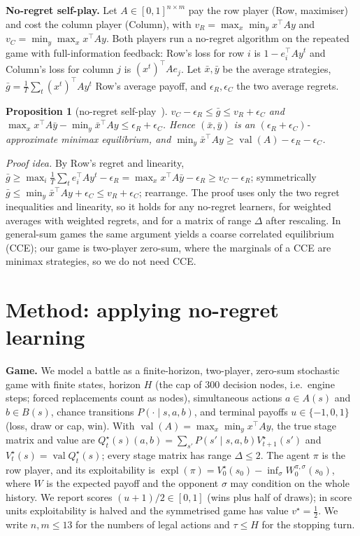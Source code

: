 \documentclass[10pt]{article}
\theoremstyle{plain}
\newtheorem{proposition}[theorem]{Proposition}
\theoremstyle{definition}
\theoremstyle{remark}
\newcommand{\Qstar}{Q^\star}
\newcommand{\Vstar}{V^\star}
\DeclareMathOperator{\val}{val}
\DeclareMathOperator{\expl}{expl}
\begin{document}
\textbf{No-regret self-play.} Let $A\in[0,1]^{n\times m}$ pay the row player (Row, maximiser) and cost the column player (Column), with $v_R=\max_x\min_yx^\top Ay$ and $v_C=\min_y\max_xx^\top Ay$. Both players run a no-regret algorithm on the repeated game with full-information feedback: Row's loss for row $i$ is $1-e_i^\top Ay^t$ and Column's loss for column $j$ is $(x^t)^\top Ae_j$. Let $\bar x,\bar y$ be the average strategies, $\bar g=\frac1T\sum_t(x^t)^\top Ay^t$ Row's average payoff, and $\epsilon_R,\epsilon_C$ the two average regrets.
\begin{proposition}[no-regret self-play~\cite{FS97,CS535L6}]\label{prop:selfplay}
$v_C-\epsilon_R\le\bar g\le v_R+\epsilon_C$ and $\max_xx^\top A\bar y-\min_y\bar x^\top Ay\le\epsilon_R+\epsilon_C$. Hence $(\bar x,\bar y)$ is an $(\epsilon_R+\epsilon_C)$-approximate minimax equilibrium, and $\min_y\bar x^\top Ay\ge\val(A)-\epsilon_R-\epsilon_C$.
\end{proposition}
\emph{Proof idea.} By Row's regret and linearity, $\bar g\ge\max_i\frac1T\sum_te_i^\top Ay^t-\epsilon_R=\max_xx^\top A\bar y-\epsilon_R\ge v_C-\epsilon_R$; symmetrically $\bar g\le\min_y\bar x^\top Ay+\epsilon_C\le v_R+\epsilon_C$; rearrange. The proof uses only the two regret inequalities and linearity, so it holds for any no-regret learners, for weighted averages with weighted regrets, and for a matrix of range $\Delta$ after rescaling. In general-sum games the same argument yields a coarse correlated equilibrium (CCE); our game is two-player zero-sum, where the marginals of a CCE are minimax strategies, so we do not need CCE.

\section{Method: applying no-regret learning}
\label{sec:setting}
\textbf{Game.} We model a battle as a finite-horizon, two-player, zero-sum stochastic game with finite states, horizon $H$ (the cap of 300 decision nodes, i.e.\ engine steps; forced replacements count as nodes), simultaneous actions $a\in A(s)$ and $b\in B(s)$, chance transitions $P(\cdot\mid s,a,b)$, and terminal payoffs $u\in\{-1,0,1\}$ (loss, draw or cap, win). With $\val(A)=\max_x\min_y x^\top Ay$, the true stage matrix and value are $\Qstar_t(s)(a,b)=\sum_{s'}P(s'\mid s,a,b)\Vstar_{t+1}(s')$ and $\Vstar_t(s)=\val\Qstar_t(s)$; every stage matrix has range $\Delta\le2$. The agent $\pi$ is the row player, and its exploitability is $\expl(\pi)=\Vstar_0(s_0)-\inf_\sigma W^{\pi,\sigma}_0(s_0)$, where $W$ is the expected payoff and the opponent $\sigma$ may condition on the whole history. We report scores $(u+1)/2\in[0,1]$ (wins plus half of draws); in score units exploitability is halved and the symmetrised game has value $v^\star=\frac12$. We write $n,m\le13$ for the numbers of legal actions and $\tau\le H$ for the stopping turn.
\end{document}

